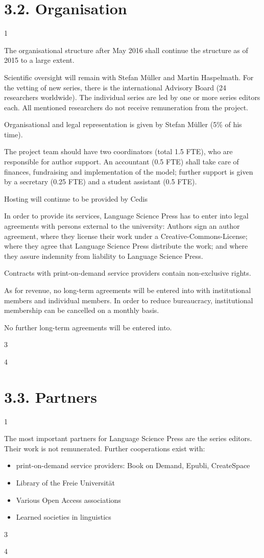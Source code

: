\documentclass[output=guidelines,draftmode]{langscibook}
\newcommand{\background}[1]{ 
  \vspace{5mm}
  \renewcommand{\tblslinecolour}{lsDarkBlue}
  \tblssy[red]{explore2}{Background}{#1}
}
\newcommand{\langscisolution}[1]{
  \renewcommand{\tblslinecolour}{lsLightBlue}
  \tblssy{langsci}{LangSci solution}{#1}
}
\newcommand{\evaluation}[1]{
  \renewcommand{\tblslinecolour}{lsLightOrange}
  \tblssy{receipt}{Evaluation}{#1}
}
\newcommand{\othersolutions}[1]{
  \renewcommand{\tblslinecolour}{lsDarkGreenOne}
  \tblssy{more}{Other solutions}{#1}
}
\renewcommand{\tblssy}[4][black!12]{%
  \renewcommand{\langscisymbol}{#2}\renewcommand{\tblsboxcolor}{#1}
  \begin{mdframed}[style=yellowexercise,frametitle={#3}]
    #4
  \end{mdframed}
}
\begin{document}
\section{3.2. Organisation }

\background{1}
\langscisolution{

The organisational structure after May 2016 shall continue the structure as of 2015 to a large extent.

Scientific oversight will remain with Stefan Müller and Martin Haspelmath. For the vetting of new series, there is the international Advisory Board (24 researchers worldwide). The individual series are led by one or more series editors each. All mentioned researchers do not receive remuneration from the project. 

Organisational and legal representation is given by Stefan Müller (5\% of his time).

The project team should have two coordinators (total 1.5 FTE), who are responsible for author support. An accountant (0.5 FTE) shall take care of finances, fundraising and implementation of the model; further support is given by a secretary (0.25 FTE) and a student assistant (0.5 FTE). 

Hosting will continue to be provided by Cedis

In order to provide its services, Language Science Press has to enter into legal agreements with persons external to the university: Authors sign an author agreement, where they license their work under a Creative-Commons-License; where they agree that Language Science Press distribute the work; and where they assure indemnity from liability to Language Science Press.

Contracts with print-on-demand service providers contain non-exclusive rights. 

As for revenue, no long-term agreements will be entered into with institutional members and individual members. In order to reduce bureaucracy, institutional membership can be cancelled on a monthly basis. 

No further long-term agreements will be entered into. 

}
\evaluation{3}
\othersolutions{4}
 
\section{3.3. Partners}

\background{1}
\langscisolution{
The most important partners for Language Science Press are the series editors. Their work is not remunerated. Further cooperations exist with:
\begin{itemize}
 \item print-on-demand service providers: Book on Demand, Epubli, CreateSpace 
 \item Library of the Freie Universität 
 \item Various Open Access associations 
 \item Learned societies in linguistics
\end{itemize}
}
\evaluation{3}
\othersolutions{4}
 
\end{document}
